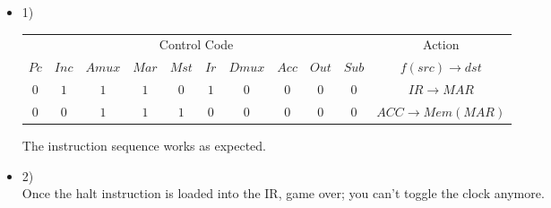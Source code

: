 \documentclass{article}
\begin{document}
\begin{itemize}
  \item
    1)\\
    \begin{tabular}{cccccccccc|c}
    \multicolumn{10}{c|}{Control Code} & Action \\
    $Pc$ & $Inc$ & $Amux$ & $Mar$ & $Mst$ & $Ir$ & $Dmux$ & $Acc$ & $Out$ & $Sub$ & $f(src)\to dst$ \\ \hline
    $0$  & $1$   & $1$    & $1$   & $0$   & $1$  & $0$    & $0$   & $0$   & $0$   & $IR\to MAR$ \\
    $0$  & $0$   & $1$    & $1$   & $1$   & $0$  & $0$    & $0$   & $0$   & $0$   & $ACC\to Mem(MAR)$ \\
    \end{tabular}
    The instruction sequence works as expected.
  \item
    2)\\
    Once the halt instruction is loaded into the IR, game over; you can't toggle the clock anymore.
\end{itemize}
\end{document}
